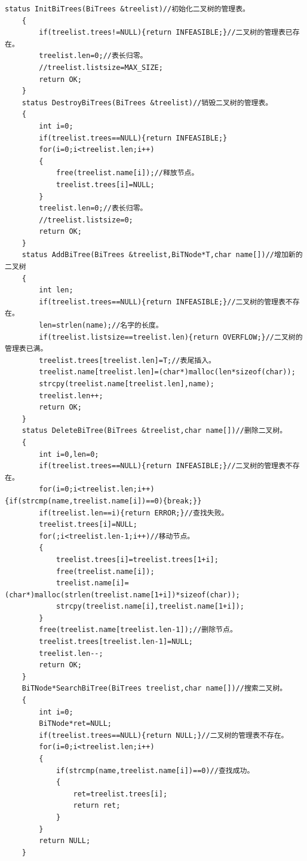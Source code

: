 \documentclass[supercite]{Experimental_Report}
\theoremstyle{definition}
\begin{document}
\begin{lstlisting}[title=多二叉树管理,frame=none]
	status InitBiTrees(BiTrees &treelist)//初始化二叉树的管理表。 
	{
		if(treelist.trees!=NULL){return INFEASIBLE;}//二叉树的管理表已存在。 
		treelist.len=0;//表长归零。 
		//treelist.listsize=MAX_SIZE;
		return OK;
	}
	status DestroyBiTrees(BiTrees &treelist)//销毁二叉树的管理表。
	{
		int i=0;
		if(treelist.trees==NULL){return INFEASIBLE;}
		for(i=0;i<treelist.len;i++)
		{
			free(treelist.name[i]);//释放节点。 
			treelist.trees[i]=NULL;
		}
		treelist.len=0;//表长归零。 
		//treelist.listsize=0;
		return OK;
	}
	status AddBiTree(BiTrees &treelist,BiTNode*T,char name[])//增加新的二叉树 
	{
		int len;
		if(treelist.trees==NULL){return INFEASIBLE;}//二叉树的管理表不存在。
		len=strlen(name);//名字的长度。 
		if(treelist.listsize==treelist.len){return OVERFLOW;}//二叉树的管理表已满。 
		treelist.trees[treelist.len]=T;//表尾插入。 
		treelist.name[treelist.len]=(char*)malloc(len*sizeof(char));
		strcpy(treelist.name[treelist.len],name);
		treelist.len++;
		return OK;
	}
	status DeleteBiTree(BiTrees &treelist,char name[])//删除二叉树。 
	{
		int i=0,len=0;
		if(treelist.trees==NULL){return INFEASIBLE;}//二叉树的管理表不存在。
		for(i=0;i<treelist.len;i++){if(strcmp(name,treelist.name[i])==0){break;}}
		if(treelist.len==i){return ERROR;}//查找失败。 
		treelist.trees[i]=NULL;
		for(;i<treelist.len-1;i++)//移动节点。 
		{
			treelist.trees[i]=treelist.trees[1+i];
			free(treelist.name[i]);
			treelist.name[i]=(char*)malloc(strlen(treelist.name[1+i])*sizeof(char));
			strcpy(treelist.name[i],treelist.name[1+i]); 
		}
		free(treelist.name[treelist.len-1]);//删除节点。 
		treelist.trees[treelist.len-1]=NULL;
		treelist.len--;
		return OK;
	}
	BiTNode*SearchBiTree(BiTrees treelist,char name[])//搜索二叉树。 
	{
		int i=0;
		BiTNode*ret=NULL;
		if(treelist.trees==NULL){return NULL;}//二叉树的管理表不存在。
		for(i=0;i<treelist.len;i++)
		{
			if(strcmp(name,treelist.name[i])==0)//查找成功。 
			{
				ret=treelist.trees[i];
				return ret;
			}
		}
		return NULL;
	}
\end{lstlisting}
\newpage
\end{document}
